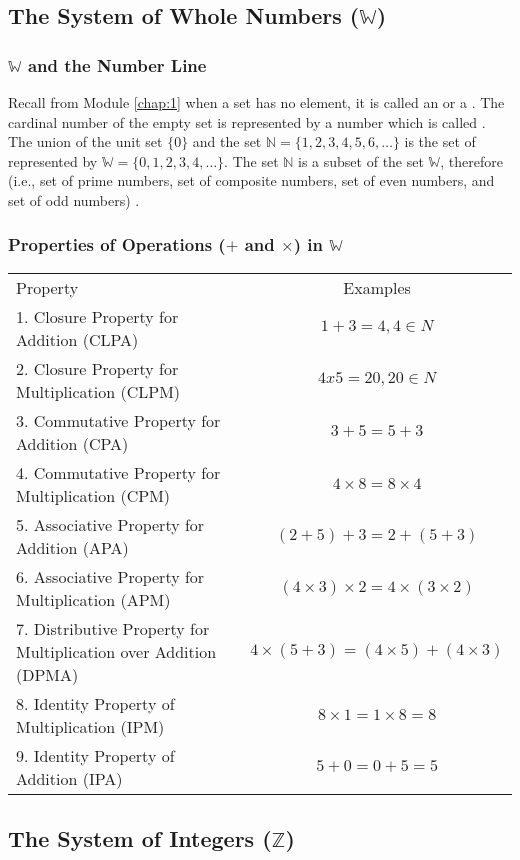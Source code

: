 \subsection*{The System of Whole Numbers ($\mathbb{W}$)}
\subsubsection*{$\mathbb{W}$ and the Number Line}
Recall from Module \ref{chap:1} when a set has no element, it is called an  or a . The cardinal number of
the empty set is represented by a number which is called . The union of the unit set $\{0\}$ and the set
$\mathbb{N} = \{1, 2, 3, 4, 5, 6, \ldots\}$ is the set of  represented by $\mathbb{W} = \{0, 1, 2, 3, 4, \ldots\}$. The set $\mathbb N$
is a subset of the set $\mathbb W$, therefore  (i.e., set of prime numbers, set of composite
numbers, set of even numbers, and set of odd numbers) .
\subsubsection*{Properties of Operations ($+$ and $\times$) in $\mathbb W$}
\begin{tabularx}{\linewidth}{XC}
Property & Examples\\
1. Closure Property for Addition (CLPA) & $1 + 3 = 4, 4 \in N$\\
2. Closure Property for Multiplication (CLPM) & $4 x 5 = 20, 20 \in N$\\
3. Commutative Property for Addition (CPA) & $3+5=5+3$\\
4. Commutative Property for Multiplication (CPM) & $4\times 8=8\times 4$\\
5. Associative Property for Addition (APA) & $(2 + 5) + 3 = 2 + (5 + 3)$\\
6. Associative Property for Multiplication (APM) & $(4 \times 3) \times 2 = 4 \times (3 \times 2)$\\
7. Distributive Property for Multiplication over Addition (DPMA) & $4 \times (5 + 3) = (4 \times 5) + (4 \times 3)$\\
8. Identity Property of Multiplication (IPM) & $8\times1=1\times8=8$\\
9. Identity Property of Addition (IPA) & $5 + 0 = 0 + 5= 5$\\
\end{tabularx}

\subsection*{The System of Integers ($\mathbb{Z}$)}
